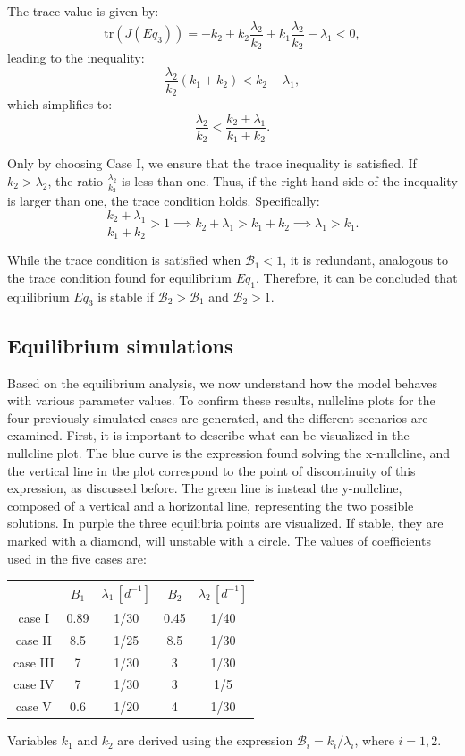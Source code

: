 The trace value is given by:
\[
\text{tr}(J(Eq_3)) = -k_2 + k_2 \frac{\lambda_2}{k_2} + k_1 \frac{\lambda_2}{k_2} - \lambda_1 < 0,
\]
leading to the inequality:
\[
\frac{\lambda_2}{k_2} (k_1 + k_2) < k_2 + \lambda_1,
\]
which simplifies to:
\[
\frac{\lambda_2}{k_2} < \frac{k_2 + \lambda_1}{k_1 + k_2}.
\]

Only by choosing Case I, we ensure that the trace inequality is satisfied. If \(k_2 > \lambda_2\), the ratio \(\frac{\lambda_2}{k_2}\) is less than one. Thus, if the right-hand side of the inequality is larger than one, the trace condition holds. Specifically:
\[
\frac{k_2 + \lambda_1}{k_1 + k_2} > 1 \implies k_2 + \lambda_1 > k_1 + k_2 \implies \lambda_1 > k_1.
\]

While the trace condition is satisfied when \(\mathcal{B}_1 < 1\), it is redundant, analogous to the trace condition found for equilibrium \(Eq_1\). Therefore, it can be concluded that equilibrium \(Eq_3\) is stable if \(\mathcal{B}_2 > \mathcal{B}_1\) and \(\mathcal{B}_2 > 1\).

 
\subsection{Equilibrium simulations}

Based on the equilibrium analysis, we now understand how the model behaves with various parameter values. To confirm these results, nullcline plots for the four previously simulated cases are generated, and the different scenarios are examined. First, it is important to describe what can be visualized in the nullcline plot. The blue curve is the expression found solving the x-nullcline, and the vertical line in the plot correspond to the point of discontinuity of this expression, as discussed before. The green line is instead the y-nullcline, composed of a vertical and a horizontal line, representing the two possible solutions. In purple the three equilibria points are visualized. If stable, they are marked with a diamond, will unstable with a circle.  
The values of coefficients used in the five cases are:
\begin{center}
 \begin{tabular}{|c|c|c|c|c|}
 	\hline
 	& $B_1$ & $\lambda_1 \,[d^{-1}]$ & $B_2$ & $\lambda_2 \, [d^{-1}]$ \\
 	\hline
 	case I & 0.89 & 1/30 & 0.45 & 1/40 \\
 	\hline
 	case II & 8.5 & 1/25 & 8.5 & 1/30 \\
 	\hline
 	case III & 7 & 1/30 & 3 & 1/30 \\
 	\hline
 	case IV & 7 & 1/30 & 3 & 1/5 \\
 	\hline
 	case V & 0.6 & 1/20 & 4& 1/30 \\  
 	\hline
 \end{tabular}
\end{center}
Variables $k_1$ and $k_2$ are derived using the expression $\mathcal{B}_i = k_i/\lambda_i$, where $i = 1, 2$.\\


